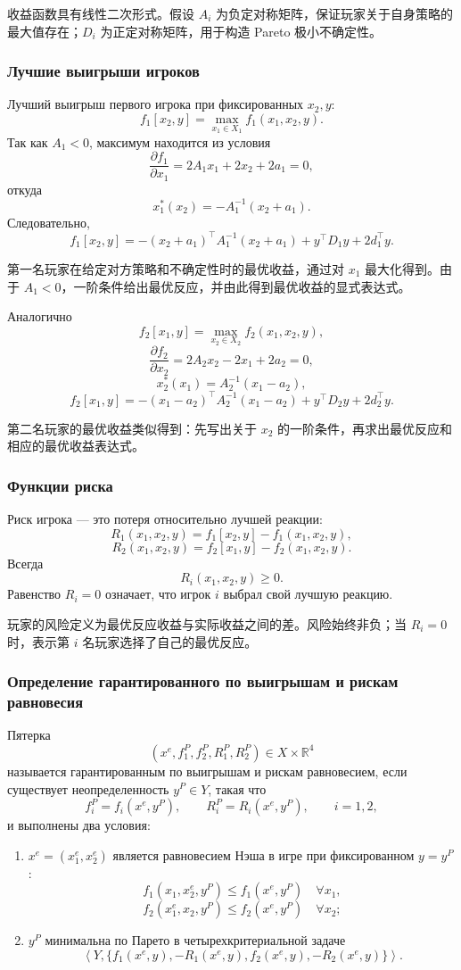\documentclass[12pt,a4paper]{article}
\newcommand{\R}{\mathbb{R}}
\newcommand{\zh}[1]{\par\noindent #1\par}
\begin{document}
\zh{收益函数具有线性二次形式。假设 $A_i$ 为负定对称矩阵，保证玩家关于自身策略的最大值存在；$D_i$ 为正定对称矩阵，用于构造 Pareto 极小不确定性。}

\subsubsection{Лучшие выигрыши игроков}
Лучший выигрыш первого игрока при фиксированных $x_2,y$:
\[
f_1[x_2,y]=\max_{x_1\in X_1}f_1(x_1,x_2,y).
\]
Так как $A_1<0$, максимум находится из условия
\[
\frac{\partial f_1}{\partial x_1}=2A_1x_1+2x_2+2a_1=0,
\]
откуда
\[
x_1^*(x_2)=-A_1^{-1}(x_2+a_1).
\]
Следовательно,
\[
f_1[x_2,y]=-(x_2+a_1)^\top A_1^{-1}(x_2+a_1)+y^\top D_1y+2d_1^\top y.
\]

\zh{第一名玩家在给定对方策略和不确定性时的最优收益，通过对 $x_1$ 最大化得到。由于 $A_1<0$，一阶条件给出最优反应，并由此得到最优收益的显式表达式。}

Аналогично
\[
f_2[x_1,y]=\max_{x_2\in X_2}f_2(x_1,x_2,y),
\]
\[
\frac{\partial f_2}{\partial x_2}=2A_2x_2-2x_1+2a_2=0,
\]
\[
x_2^*(x_1)=A_2^{-1}(x_1-a_2),
\]
\[
f_2[x_1,y]=-(x_1-a_2)^\top A_2^{-1}(x_1-a_2)+y^\top D_2y+2d_2^\top y.
\]

\zh{第二名玩家的最优收益类似得到：先写出关于 $x_2$ 的一阶条件，再求出最优反应和相应的最优收益表达式。}


\subsubsection{Функции риска}
Риск игрока --- это потеря относительно лучшей реакции:
\[
R_1(x_1,x_2,y)=f_1[x_2,y]-f_1(x_1,x_2,y),
\]
\[
R_2(x_1,x_2,y)=f_2[x_1,y]-f_2(x_1,x_2,y).
\]
Всегда
\[
R_i(x_1,x_2,y)\ge 0.
\]
Равенство $R_i=0$ означает, что игрок $i$ выбрал свой лучшую реакцию.

\zh{玩家的风险定义为最优反应收益与实际收益之间的差。风险始终非负；当 $R_i=0$ 时，表示第 $i$ 名玩家选择了自己的最优反应。}

\subsubsection{Определение гарантированного по выигрышам и рискам равновесия}
Пятерка
\[
(x^e,f_1^P,f_2^P,R_1^P,R_2^P)\in X\times\R^4
\]
называется гарантированным по выигрышам и рискам равновесием, если существует неопределенность $y^P\in Y$, такая что
\[
f_i^P=f_i(x^e,y^P),
\qquad R_i^P=R_i(x^e,y^P),
\qquad i=1,2,
\]
и выполнены два условия:
\begin{enumerate}
  \item $x^e=(x_1^e,x_2^e)$ является равновесием Нэша в игре при фиксированном $y=y^P$:
  \[
  f_1(x_1,x_2^e,y^P)\le f_1(x^e,y^P)\quad \forall x_1,
  \]
  \[
  f_2(x_1^e,x_2,y^P)\le f_2(x^e,y^P)\quad \forall x_2;
  \]
  \item $y^P$ минимальна по Парето в четырехкритериальной задаче
  \[
  \left\langle Y,\{f_1(x^e,y),-R_1(x^e,y),f_2(x^e,y),-R_2(x^e,y)\}\right\rangle.
  \]
\end{enumerate}
\end{document}
